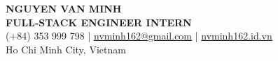 \begin{center}
    {\fontsize{25}{28}\selectfont\bfseries NGUYEN VAN MINH}\\[4pt]
    {\large\bfseries FULL-STACK ENGINEER INTERN}\\[6pt]
    (+84) 353 999 798 \;|\; \href{mailto:nvminh162@gmail.com}{nvminh162@gmail.com} \;|\; \href{https://nvminh162.id.vn}{nvminh162.id.vn}\\[3pt]
    Ho Chi Minh City, Vietnam
    \\ \vspace{-1pt}
\end{center}
